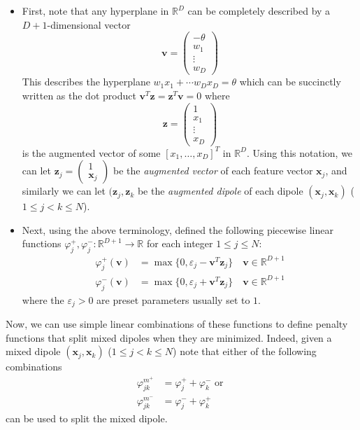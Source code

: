 \documentclass[12pt]{amsart}
\theoremstyle{definition}
\theoremstyle{plain}
\theoremstyle{remark}
\newcommand{\RR}{\mathbb{R}}
\newcommand{\eps}{\varepsilon}
\begin{document}
\begin{itemize}
	\item First, note that any hyperplane in $\RR^D$ can be completely described by a $D + 1$-dimensional vector
	$$
	\mathbf{v} = \begin{pmatrix} -\theta \\ w_1 \\ \vdots \\ w_D \end{pmatrix}
	$$ This describes the hyperplane
	$
	w_1 x_1 + \cdots w_D x_D = \theta
	$ which can be succinctly written as the dot product
	$
	\mathbf{v}^T \mathbf{z} = \mathbf{z}^T \mathbf{v} = 0
	$ where 
	$$
	\mathbf{z} = \begin{pmatrix} 1 \\ x_1 \\ \vdots \\ x_D \end{pmatrix}
	$$ is the augmented vector of some $[x_1, \ldots, x_D]^T$ in $\RR^D$. Using this notation, we can let
	$
	\mathbf{z}_j = \begin{pmatrix} 1 \\ \mathbf{x}_j \end{pmatrix} 
	$ be the \emph{augmented vector} of each feature vector $\mathbf{x}_j$, and similarly we can let $
	(\mathbf{z}_j, \mathbf{z}_k 
	$ be the \emph{augmented dipole} of each dipole $(\mathbf{x}_j, \mathbf{x}_k)$ ($1 \leq j < k \leq N$).
	\item Next, using the above terminology, \cite{bobrowskikretowski} defined the following piecewise linear functions $\varphi^+_j, \varphi^-_j : \RR^{D + 1} \to \RR$ for each integer $1 \leq j \leq N$:
	\begin{align*}
		\varphi^+_j(\mathbf{v}) &= \max\{0, \eps_j - \mathbf{v}^T \mathbf{z}_j\} \quad \mathbf{v} \in \RR^{D + 1} \\
		\varphi^-_j(\mathbf{v}) &= \max\{0, \eps_j + \mathbf{v}^T \mathbf{z}_j\} \quad \mathbf{v} \in \RR^{D + 1}
	\end{align*} where the $\eps_j > 0$ are preset parameters usually set to $1$.
\end{itemize}

Now, we can use simple linear combinations of these functions to define penalty functions that split mixed dipoles when they are minimized. Indeed, given a mixed dipole $(\mathbf{x}_j, \mathbf{x}_k)$ ($1 \leq j < k \leq N$) note that either of the following combinations
\begin{align*}
	\varphi^{m^+}_{jk} &= \varphi^+_j + \varphi^-_k \text{ or } \\
	\varphi^{m^-}_{jk} &= \varphi^-_j + \varphi^+_k
\end{align*} can be used to split the mixed dipole. \\
\end{document}
